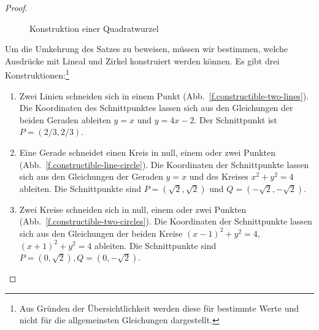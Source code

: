 \begin{proof}
\begin{figure}[b]
\begin{center}
\end{center}
\caption{Konstruktion einer Quadratwurzel}
\label{f.trisect-square-root}
\end{figure}

\medskip

Um die Umkehrung des Satzes zu beweisen, müssen wir bestimmen, welche Ausdrücke mit Lineal und Zirkel konstruiert werden können. Es gibt drei Konstruktionen:\footnote{Aus Gründen der Übersichtlichkeit werden diese für bestimmte Werte und nicht für die allgemeinsten Gleichungen dargestellt.}

\begin{enumerate}
\item Zwei Linien schneiden sich in einem Punkt (Abb.~\ref{f.constructible-two-lines}). Die Koordinaten des Schnittpunktes lassen sich aus den Gleichungen der beiden Geraden ableiten
$y=x$ und $y=4x-2$. Der Schnittpunkt ist $P= (2/3, 2/3)$.

\item Eine Gerade schneidet einen Kreis in null, einem oder zwei Punkten (Abb.~\ref{f.constructible-line-circle}). Die Koordinaten der Schnittpunkte lassen sich aus den Gleichungen der Geraden $y=x$ und des Kreises $x^2+y^2=4$ ableiten. Die Schnittpunkte sind
$P=(\sqrt{2}, \sqrt{2})$ und $Q=(-\sqrt{2}, -\sqrt{2})$.

\item Zwei Kreise schneiden sich in null, einem oder zwei Punkten (Abb.~\ref{f.constructible-two-circles}). Die Koordinaten der Schnittpunkte lassen sich aus den Gleichungen der beiden Kreise $(x-1)^2+y^2=4$, $(x+1)^2+y^2=4$ ableiten. Die Schnittpunkte sind $P=(0,\sqrt{2}),Q=(0,-\sqrt{2})$.
\end{enumerate}
\end{proof}


